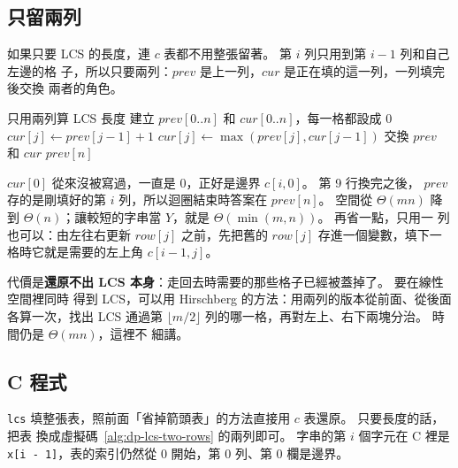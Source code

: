 \subsection{只留兩列}
\label{sec:dp-lcs-space}

如果只要 LCS 的長度，連 $c$ 表都不用整張留著。 第 $i$ 列只用到第 $i - 1$ 列和自己左邊的格
子，所以只要兩列：$\mathit{prev}$ 是上一列，$\mathit{cur}$ 是正在填的這一列，一列填完後交換
兩者的角色。

\begin{pseudo}[label=alg:dp-lcs-two-rows]{只用兩列算 LCS 長度}
    \State 建立 $\mathit{prev}[0..n]$ 和 $\mathit{cur}[0..n]$，每一格都設成 $0$
                \State $\mathit{cur}[j] \gets \mathit{prev}[j - 1] + 1$
            \Else
                \State $\mathit{cur}[j] \gets \max(\mathit{prev}[j], \mathit{cur}[j - 1])$
            \EndIf
        \EndFor
        \State 交換 $\mathit{prev}$ 和 $\mathit{cur}$ 
    \EndFor
    \State \Return $\mathit{prev}[n]$
\EndFunction
\end{pseudo}

$\mathit{cur}[0]$ 從來沒被寫過，一直是 $0$，正好是邊界 $c[i, 0]$。 第 9 行換完之後，
$\mathit{prev}$ 存的是剛填好的第 $i$ 列，所以迴圈結束時答案在 $\mathit{prev}[n]$。 空間從
$\Theta(mn)$ 降到 $\Theta(n)$；讓較短的字串當 $Y$，就是 $\Theta(\min(m, n))$。 再省一點，只用一
列也可以：由左往右更新 $\mathit{row}[j]$ 之前，先把舊的 $\mathit{row}[j]$ 存進一個變數，填下一
格時它就是需要的左上角 $c[i-1, j]$。

代價是\textbf{還原不出 LCS 本身}：走回去時需要的那些格子已經被蓋掉了。 要在線性空間裡同時
得到 LCS，可以用 Hirschberg 的方法：用兩列的版本從前面、從後面各算一次，找出 LCS 通過第
$\lfloor m/2 \rfloor$ 列的哪一格，再對左上、右下兩塊分治。 時間仍是 $\Theta(mn)$，這裡不
細講。

\subsection{C 程式}

\texttt{lcs} 填整張表，照前面「省掉箭頭表」的方法直接用 $c$ 表還原。 只要長度的話，把表
換成虛擬碼~\ref{alg:dp-lcs-two-rows} 的兩列即可。 字串的第 $i$ 個字元在 C 裡是 \texttt{x[i - 1]}，表的索引仍然從 $0$ 開始，第 $0$
列、第 $0$ 欄是邊界。

